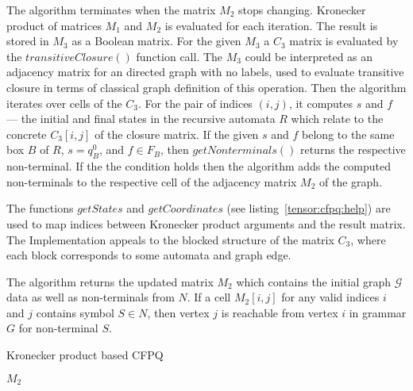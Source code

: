 The algorithm terminates when the matrix $M_2$ stops changing.
Kronecker product of matrices $M_1$ and $M_2$ is evaluated for each iteration.
The result is stored in $M_3$ as a Boolean matrix.
For the given $M_3$ a $C_3$ matrix is evaluated by the $transitiveClosure()$ 
function call. The $M_3$ could be interpreted as an adjacency matrix for an 
directed graph with no labels, used to evaluate transitive closure in terms of 
classical graph definition of this operation.
Then the algorithm iterates over cells of the $C_3$.
For the pair of indices $(i,j)$, it computes $s$ and $f$ --- 
the initial and final states in the recursive automata $R$ which relate 
to the concrete $C_3[i,j]$ of the closure matrix.
If the given $s$ and $f$ belong to the same box $B$ of $R$, $s = q_B^0$, 
and $f \in F_B$, then $getNonterminals()$ returns the respective non-terminal.
If the the condition holds then the algorithm  adds the computed non-terminals 
to the respective cell of the adjacency matrix $M_2$ of the graph.

The functions $getStates$ and $getCoordinates$ (see listing~\ref{tensor:cfpq:help})
are used to map indices between Kronecker product arguments and the result matrix.
The Implementation appeals to the blocked structure of the matrix $C_3$, 
where each block corresponds to some automata and graph edge.

The algorithm returns the updated matrix $M_2$ which contains the initial 
graph $\mathcal{G}$ data as well as non-terminals from $N$.
If a cell $M_2[i,j]$ for any valid indices $i$ and $j$ contains symbol 
$S \in N$, then vertex $j$ is reachable from vertex $i$ in grammar $G$ for 
non-terminal $S$.

\begin{algorithm}[h]
\begin{algorithmic}[1]
\tiny
\caption{Kronecker product based CFPQ}
\label{tensor:cfpq}
        \EndFor
    \EndFor
                \EndIf
            \EndIf
        \EndFor
    \EndWhile
\State \Return $M_2$
\EndFunction
\end{algorithmic}
\end{algorithm}

